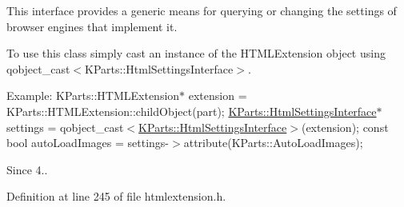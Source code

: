 \-This interface provides a generic means for querying or changing the settings of browser engines that implement it.

\-To use this class simply cast an instance of the \-H\-T\-M\-L\-Extension object using qobject\-\_\-cast$<$\-K\-Parts\-::\-Html\-Settings\-Interface$>$.

\-Example\-: {\ttfamily  \-K\-Parts\-::\-H\-T\-M\-L\-Extension$\ast$ extension = \-K\-Parts\-::\-H\-T\-M\-L\-Extension\-::child\-Object(part); \hyperlink{classKParts_1_1HtmlSettingsInterface}{\-K\-Parts\-::\-Html\-Settings\-Interface}$\ast$ settings = qobject\-\_\-cast$<$\hyperlink{classKParts_1_1HtmlSettingsInterface}{\-K\-Parts\-::\-Html\-Settings\-Interface}$>$(extension); const bool auto\-Load\-Images = settings-\/$>$attribute(\-K\-Parts\-::\-Auto\-Load\-Images); }

\begin{DoxySince}{\-Since}
4.. 
\end{DoxySince}


\-Definition at line 245 of file htmlextension.\-h.



